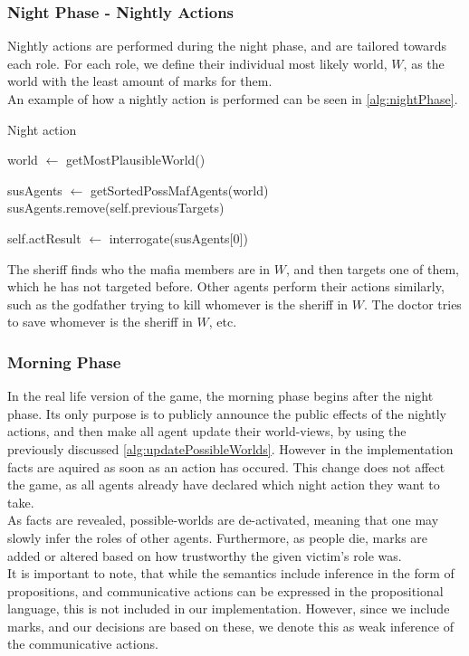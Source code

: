 \subsubsection{Night Phase - Nightly
	Actions}\label{sec:nightPhaseNightlyActions}
Nightly actions are performed during the night phase, and are tailored towards
each role. For each role, we define their individual most likely world, $W$, as
the world with the least amount of marks for them. \\ An example of how a
nightly action is performed can be seen in \cref{alg:nightPhase}.
\begin{algorithm}[H]
	\caption{Night action}
	\begin{algorithmic}[1]
		\State world $\gets$ getMostPlausibleWorld()

		\State susAgents $\gets$ getSortedPossMafAgents(world)
		\State susAgents.remove(self.previousTargets)

		\State self.actResult $\gets$ interrogate(susAgents[0])
		\EndIf
		\EndFunction

		\Statex
	\end{algorithmic}\label{alg:nightPhase}
\end{algorithm}
\setcounter{algorithmcaption}{7}
The sheriff finds who the mafia members are in $W$, and then targets one of
them, which he has not targeted before. Other agents perform their actions
similarly, such as the godfather trying to kill whomever is the sheriff in $W$.
The doctor tries to save whomever is the sheriff in $W$, etc.

\subsubsection{Morning Phase}\label{sec:morningPhase}
In the real life version of the game, the morning phase begins after the night
phase. Its only purpose is to publicly announce the public effects of the
nightly actions, and then make all agent update their world-views, by using the
previously discussed \cref{alg:updatePossibleWorlds}. However in the
implementation facts are aquired as soon as an action has occured. This
change does not affect the game, as all agents already have declared which
night action they want to take.\\ 
As facts are revealed, possible-worlds are
de-activated, meaning that one may slowly infer the roles of other agents.
Furthermore, as people die, marks are added or altered based on how trustworthy
the given victim's role was. \\ It is important to note, that while the
semantics include inference in the form of propositions, and communicative
actions can be expressed in the propositional language, this is not included in
our implementation. However, since we include marks, and our decisions are
based on these, we denote this as weak inference of the communicative actions.

